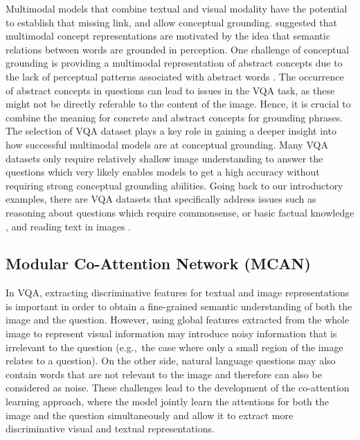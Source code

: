 \documentclass{article}
\begin{document}
Multimodal models that combine textual and visual modality have the potential to establish that missing link, and allow conceptual grounding. \citet{beinborn2018multimodal} suggested that multimodal concept representations are motivated by the idea that semantic relations between words are grounded in perception. One challenge of conceptual grounding is providing a multimodal representation of abstract concepts due to the lack of perceptual patterns associated with abstract words \citep{hill2014multi}. The occurrence of abstract concepts in questions can lead to issues in the VQA task, as these might not be directly referable to the content of the image. Hence, it is crucial to combine the meaning for concrete and abstract concepts for grounding phrases. The selection of VQA dataset plays a key role in gaining a deeper insight into how successful multimodal models are at conceptual grounding. Many VQA datasets only require relatively shallow image understanding to answer the questions which very likely enables models to get a high accuracy without requiring strong conceptual grounding abilities. Going back to our introductory examples, there are VQA datasets that specifically address issues such as reasoning about questions which require commonsense, or basic factual knowledge \citep{wang2018fvqa}, and reading text in images \citep{singh2019towards}.


\subsection{Modular Co-Attention Network (MCAN)} \label{subsection:mcan}
In VQA, extracting discriminative features for textual and image representations is important in order to obtain a fine-grained semantic understanding of both the image and the question. However, using global features extracted from the whole image to represent visual information may introduce noisy information that is irrelevant to the question (e.g.,\ the case where only a small region of the image relates to a question). On the other side, natural language questions may also contain words that are not relevant to the image and therefore can also be considered as noise. These challenges lead to the development of the co-attention learning approach, where the model jointly learn the attentions for both the image and the question simultaneously and allow it to extract more discriminative visual and textual representations. 
\end{document}
